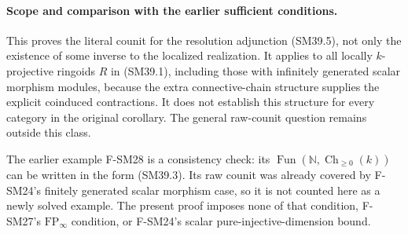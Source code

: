 \paragraph{Scope and comparison with the earlier sufficient conditions.}
This proves the literal counit for the resolution adjunction
(SM39.5), not only the existence of some inverse to the
localized realization.  It applies to all locally
\(k\)-projective ringoids \(R\) in (SM39.1), including those
with infinitely generated scalar morphism modules, because
the extra connective-chain structure supplies the explicit
coinduced contractions.  It does not establish this
structure for every category in the original corollary.
The general raw-counit question remains outside this class.

The earlier example F-SM28 is a consistency check: its
\(\operatorname{Fun}(\mathbb N,\operatorname{Ch}_{\ge0}(k))\)
can be written in the form (SM39.3).  Its raw counit was
already covered by F-SM24's finitely generated scalar
morphism case, so it is not counted here as a newly solved
example.  The present proof imposes none of that condition,
F-SM27's \(\mathrm{FP}_\infty\) condition, or F-SM24's
scalar pure-injective-dimension bound.

